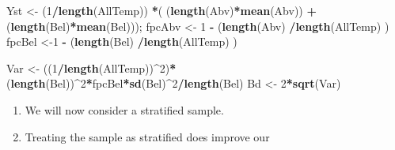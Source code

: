\documentclass[
]{article}
\newenvironment{Shaded}{\begin{snugshade}}{\end{snugshade}}
\newcommand{\DecValTok}[1]{\textcolor[rgb]{0.00,0.00,0.81}{#1}}
\newcommand{\KeywordTok}[1]{\textcolor[rgb]{0.13,0.29,0.53}{\textbf{#1}}}
\newcommand{\NormalTok}[1]{#1}
\newcommand{\OperatorTok}[1]{\textcolor[rgb]{0.81,0.36,0.00}{\textbf{#1}}}
\newcommand{\StringTok}[1]{\textcolor[rgb]{0.31,0.60,0.02}{#1}}
\begin{document}
\begin{Shaded}
\begin{Highlighting}[]
\NormalTok{  Yst <-}\StringTok{ }\NormalTok{(}\DecValTok{1}\OperatorTok{/}\KeywordTok{length}\NormalTok{(AllTemp)) }\OperatorTok{*}\NormalTok{( (}\KeywordTok{length}\NormalTok{(Abv)}\OperatorTok{*}\KeywordTok{mean}\NormalTok{(Abv)) }\OperatorTok{+}\StringTok{  }\NormalTok{(}\KeywordTok{length}\NormalTok{(Bel)}\OperatorTok{*}\KeywordTok{mean}\NormalTok{(Bel)));}
\NormalTok{fpcAbv <-}\StringTok{ }\DecValTok{1} \OperatorTok{-}\StringTok{ }\NormalTok{(}\KeywordTok{length}\NormalTok{(Abv) }\OperatorTok{/}\KeywordTok{length}\NormalTok{(AllTemp) )}
\NormalTok{fpcBel <-}\DecValTok{1} \OperatorTok{-}\StringTok{ }\NormalTok{(}\KeywordTok{length}\NormalTok{(Bel) }\OperatorTok{/}\KeywordTok{length}\NormalTok{(AllTemp) )}

\NormalTok{Var <-}\StringTok{ }\NormalTok{((}\DecValTok{1}\OperatorTok{/}\KeywordTok{length}\NormalTok{(AllTemp))}\OperatorTok{^}\DecValTok{2}\NormalTok{)}\OperatorTok{*}\NormalTok{(}\KeywordTok{length}\NormalTok{(Bel))}\OperatorTok{^}\DecValTok{2}\OperatorTok{*}\NormalTok{fpcBel}\OperatorTok{*}\KeywordTok{sd}\NormalTok{(Bel)}\OperatorTok{^}\DecValTok{2}\OperatorTok{/}\KeywordTok{length}\NormalTok{(Bel)}
\NormalTok{Bd <-}\StringTok{ }\DecValTok{2}\OperatorTok{*}\KeywordTok{sqrt}\NormalTok{(Var)}
\end{Highlighting}
\end{Shaded}

\begin{enumerate}
\def\labelenumi{\alph{enumi}.}
\setcounter{enumi}{1}
\item
  We will now consider a stratified sample.
\item
  Treating the sample as stratified does improve our
\end{enumerate}
\end{document}
